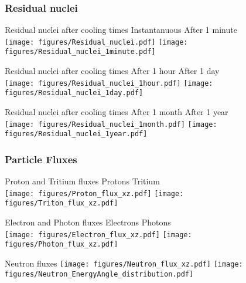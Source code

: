 \documentclass[xcolor={dvipsnames}]{beamer}
\begin{document}
\subsubsection{Residual nuclei}
\begin{frame}{Residual nuclei after cooling times}
\centering
\hspace*{1.6cm} Instantanuous \hfill After 1 minute \hspace*{1.8cm} \\
  \texttt{[image: figures/Residual\_nuclei.pdf]}
  \texttt{[image: figures/Residual\_nuclei\_1minute.pdf]}
\end{frame}
\begin{frame}{Residual nuclei after cooling times}
\centering
\hspace*{1.6cm} After 1 hour \hfill After 1 day \hspace*{1.8cm} \\
  \texttt{[image: figures/Residual\_nuclei\_1hour.pdf]}
  \texttt{[image: figures/Residual\_nuclei\_1day.pdf]}
\end{frame}
\begin{frame}{Residual nuclei after cooling times}
\centering
\hspace*{1.6cm} After 1 month \hfill After 1 year \hspace*{1.8cm} \\
  \texttt{[image: figures/Residual\_nuclei\_1month.pdf]}
  \texttt{[image: figures/Residual\_nuclei\_1year.pdf]}
\end{frame}

\subsubsection{Particle Fluxes}
\begin{frame}{Proton and Tritium fluxes}
\centering
\hspace*{2cm} Protons \hfill Tritium \hspace*{2cm} \\
  \texttt{[image: figures/Proton\_flux\_xz.pdf]}
  \texttt{[image: figures/Triton\_flux\_xz.pdf]}
\end{frame}
\begin{frame}{Electron and Photon fluxes}
\centering
\hspace*{2cm} Electrons \hfill Photons \hspace*{2cm} \\
  \texttt{[image: figures/Electron\_flux\_xz.pdf]}
  \texttt{[image: figures/Photon\_flux\_xz.pdf]}
\end{frame}
\begin{frame}{Neutron fluxes}
\centering
  \texttt{[image: figures/Neutron\_flux\_xz.pdf]}
  \texttt{[image: figures/Neutron\_EnergyAngle\_distribution.pdf]}
\end{frame}
\end{document}
